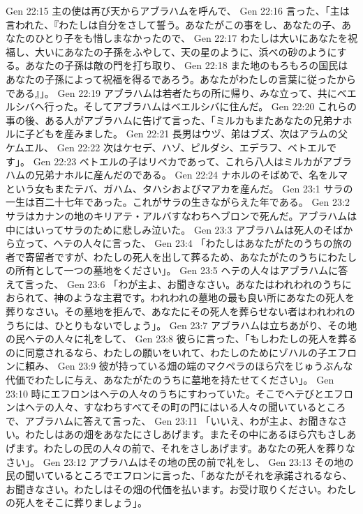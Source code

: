 Gen 22:15  主の使は再び天からアブラハムを呼んで、
Gen 22:16  言った、「主は言われた、『わたしは自分をさして誓う。あなたがこの事をし、あなたの子、あなたのひとり子をも惜しまなかったので、
Gen 22:17  わたしは大いにあなたを祝福し、大いにあなたの子孫をふやして、天の星のように、浜べの砂のようにする。あなたの子孫は敵の門を打ち取り、
Gen 22:18  また地のもろもろの国民はあなたの子孫によって祝福を得るであろう。あなたがわたしの言葉に従ったからである』」。
Gen 22:19  アブラハムは若者たちの所に帰り、みな立って、共にベエルシバへ行った。そしてアブラハムはベエルシバに住んだ。
Gen 22:20  これらの事の後、ある人がアブラハムに告げて言った、「ミルカもまたあなたの兄弟ナホルに子どもを産みました。
Gen 22:21  長男はウヅ、弟はブズ、次はアラムの父ケムエル、
Gen 22:22  次はケセデ、ハゾ、ピルダシ、エデラフ、ベトエルです」。
Gen 22:23  ベトエルの子はリベカであって、これら八人はミルカがアブラハムの兄弟ナホルに産んだのである。
Gen 22:24  ナホルのそばめで、名をルマという女もまたテバ、ガハム、タハシおよびマアカを産んだ。
Gen 23:1  サラの一生は百二十七年であった。これがサラの生きながらえた年である。
Gen 23:2  サラはカナンの地のキリアテ・アルバすなわちヘブロンで死んだ。アブラハムは中にはいってサラのために悲しみ泣いた。
Gen 23:3  アブラハムは死人のそばから立って、ヘテの人々に言った、
Gen 23:4  「わたしはあなたがたのうちの旅の者で寄留者ですが、わたしの死人を出して葬るため、あなたがたのうちにわたしの所有として一つの墓地をください」。
Gen 23:5  ヘテの人々はアブラハムに答えて言った、
Gen 23:6  「わが主よ、お聞きなさい。あなたはわれわれのうちにおられて、神のような主君です。われわれの墓地の最も良い所にあなたの死人を葬りなさい。その墓地を拒んで、あなたにその死人を葬らせない者はわれわれのうちには、ひとりもないでしょう」。
Gen 23:7  アブラハムは立ちあがり、その地の民ヘテの人々に礼をして、
Gen 23:8  彼らに言った、「もしわたしの死人を葬るのに同意されるなら、わたしの願いをいれて、わたしのためにゾハルの子エフロンに頼み、
Gen 23:9  彼が持っている畑の端のマクペラのほら穴をじゅうぶんな代価でわたしに与え、あなたがたのうちに墓地を持たせてください」。
Gen 23:10  時にエフロンはヘテの人々のうちにすわっていた。そこでヘテびとエフロンはヘテの人々、すなわちすべてその町の門にはいる人々の聞いているところで、アブラハムに答えて言った、
Gen 23:11  「いいえ、わが主よ、お聞きなさい。わたしはあの畑をあなたにさしあげます。またその中にあるほら穴もさしあげます。わたしの民の人々の前で、それをさしあげます。あなたの死人を葬りなさい」。
Gen 23:12  アブラハムはその地の民の前で礼をし、
Gen 23:13  その地の民の聞いているところでエフロンに言った、「あなたがそれを承諾されるなら、お聞きなさい。わたしはその畑の代価を払います。お受け取りください。わたしの死人をそこに葬りましょう」。
